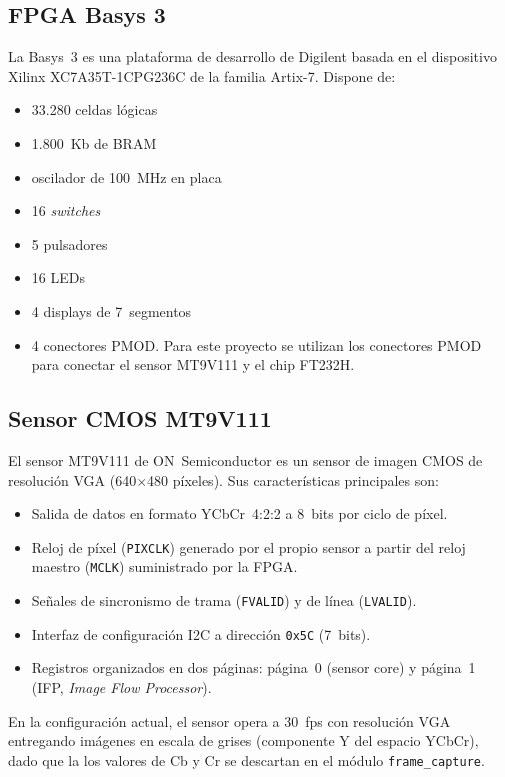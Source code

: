 \documentclass[../main.tex]{subfiles}
\begin{document}
\subsection{FPGA Basys 3}

La Basys~3 es una plataforma de desarrollo de Digilent basada en el dispositivo Xilinx XC7A35T-1CPG236C de la familia Artix-7. Dispone de: 
\begin{itemize}
    \item 33.280 celdas lógicas
    \item 1.800~Kb de BRAM
    \item oscilador de 100~MHz en placa
    \item 16 \textit{switches}
    \item 5 pulsadores
    \item 16 LEDs
    \item 4 displays de 7~segmentos
    \item 4 conectores PMOD. Para este proyecto se utilizan los conectores PMOD para conectar el sensor MT9V111 y el chip FT232H.
\end{itemize}

\subsection{Sensor CMOS MT9V111}

El sensor MT9V111 de ON~Semiconductor es un sensor de imagen CMOS de resolución VGA (640$\times$480 píxeles). Sus características principales son:

\begin{itemize}
    \item Salida de datos en formato YCbCr~4:2:2 a 8~bits por ciclo de píxel.
    \item Reloj de píxel (\texttt{PIXCLK}) generado por el propio sensor a partir del reloj maestro (\texttt{MCLK}) suministrado por la FPGA.
    \item Señales de sincronismo de trama (\texttt{FVALID}) y de línea (\texttt{LVALID}).
    \item Interfaz de configuración I2C a dirección \texttt{0x5C} (7~bits).
    \item Registros organizados en dos páginas: página~0 (sensor core) y página~1 (IFP, \textit{Image Flow Processor}).
\end{itemize}

En la configuración actual, el sensor opera a 30~fps con resolución VGA entregando imágenes en escala de grises (componente Y del espacio YCbCr), dado que la los valores de Cb y Cr se descartan en el módulo \texttt{frame\_capture}.
\end{document}
